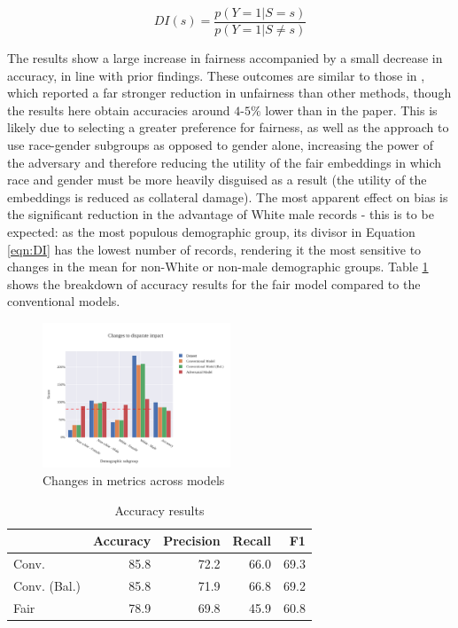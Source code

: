 \documentclass[conference]{IEEEtran}
\begin{document}
\begin{equation}
    DI(s) = \frac{p(Y=1|S=s)}{p(Y=1|S\not=s)}
    \label{eqn:DI}
\end{equation}

The results show a large increase in fairness accompanied by a small decrease in accuracy, in line with prior findings. These outcomes are similar to those in \cite{DBLP:journals/corr/abs-1802-06309}, which reported a far stronger reduction in unfairness than other methods, though the results here obtain accuracies around $4$-$5\%$ lower than in the paper. This is likely due to selecting a greater preference for fairness, as well as the approach to use race-gender subgroups as opposed to gender alone, increasing the power of the adversary and therefore reducing the utility of the fair embeddings in which race and gender must be more heavily disguised as a result (the utility of the embeddings is reduced as collateral damage). The most apparent effect on bias is the significant reduction in the advantage of White male records - this is to be expected: as the most populous demographic group, its divisor in Equation \ref{eqn:DI} has the lowest number of records, rendering it the most sensitive to changes in the mean for non-White or non-male demographic groups. Table \ref{tab:acc} shows the breakdown of accuracy results for the fair model compared to the conventional models.

\begin{figure}[h]
    \centering
    \includegraphics[width=0.5\textwidth]{images/fairness_improv.pdf}
    \caption{Changes in metrics across models}
    \label{fig:fairness_improv}
\end{figure}

\begin{table}
    \caption{Accuracy results}
    \label{tab:acc}
    \centering
    \begin{tabular}{lrrrr}
        \toprule
        {} &  Accuracy &  Precision &  Recall &    F1 \\
        \midrule
        Conv.        &      85.8 &       72.2 &    66.0 &  69.3 \\
        Conv. (Bal.) &      85.8 &       71.9 &    66.8 &  69.2 \\
        Fair         &      78.9 &       69.8 &    45.9 &  60.8 \\
        \bottomrule
    \end{tabular}
\end{table}
\end{document}

